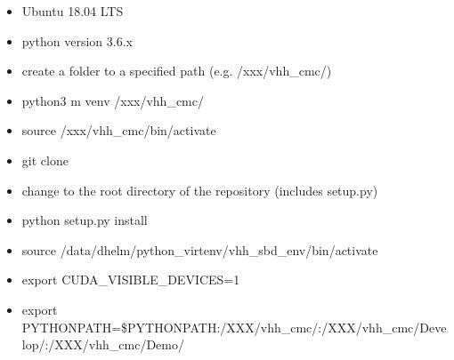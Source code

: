 \documentclass[letterpaper,10pt,english,openany,oneside]{sphinxmanual}
\begin{document}
\begin{itemize}
\item {} 
Ubuntu 18.04 LTS

\item {} 
python version 3.6.x

\end{itemize}

\begin{itemize}
\item {} 
create a folder to a specified path (e.g. /xxx/vhh\_cmc/)

\item {} 
python3 \sphinxhyphen{}m venv /xxx/vhh\_cmc/

\end{itemize}

\begin{itemize}
\item {} 
source /xxx/vhh\_cmc/bin/activate

\end{itemize}

\begin{itemize}
\item {} 
git clone 

\end{itemize}

\begin{itemize}
\item {} 
change to the root directory of the repository (includes setup.py)

\item {} 
python setup.py install

\end{itemize}

\begin{itemize}
\item {} 
source /data/dhelm/python\_virtenv/vhh\_sbd\_env/bin/activate

\item {} 
export CUDA\_VISIBLE\_DEVICES=1

\item {} 
export PYTHONPATH=\$PYTHONPATH:/XXX/vhh\_cmc/:/XXX/vhh\_cmc/Develop/:/XXX/vhh\_cmc/Demo/

\end{itemize}
\end{document}
